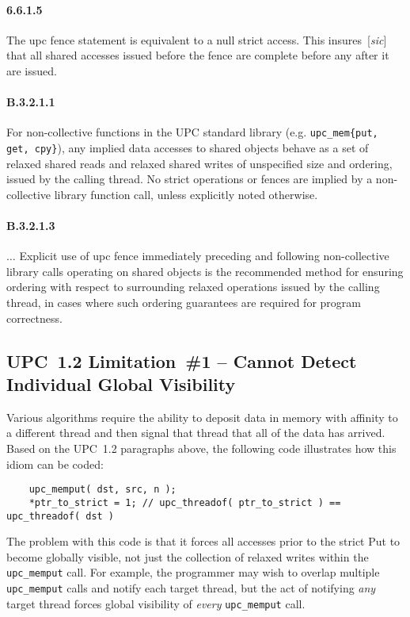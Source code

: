 \documentclass[10pt]{article}
\def \memput  {{\tt upc\_memput}}
\def \memall  {{\tt upc\_mem\{put, get, cpy\}}}
\begin{document}
\paragraph{6.6.1.5} The upc fence statement is equivalent to a null strict
access.  This insures~[{\em sic}] that all shared accesses issued before the
fence are complete before any after it are issued.

\paragraph{B.3.2.1.1} For non-collective functions in the UPC standard library
(e.g. \memall{}), any implied data accesses to shared objects behave as a set of
relaxed shared reads and relaxed shared writes of unspecified size and ordering,
issued by the calling thread. No strict operations or fences are implied by a
non-collective library function call, unless explicitly noted otherwise.

\paragraph{B.3.2.1.3} $\ldots$ Explicit use of upc fence immediately preceding
and following non-collective library calls operating on shared objects is the
recommended method for ensuring ordering with respect to surrounding relaxed
operations issued by the calling thread, in cases where such ordering guarantees
are required for program correctness.

\subsection{UPC~1.2 Limitation~\#1 -- Cannot Detect Individual Global Visibility}

Various algorithms require the ability to deposit data in memory with affinity
to a different thread and then signal that thread that all of the data has
arrived.  Based on the UPC~1.2 paragraphs above, the following code illustrates
how this idiom can be coded:

\begin{verbatim}
    upc_memput( dst, src, n );
    *ptr_to_strict = 1; // upc_threadof( ptr_to_strict ) == upc_threadof( dst )
\end{verbatim}

The problem with this code is that it forces all accesses prior to the strict
Put to become globally visible, not just the collection of relaxed writes within
the \memput{} call.  For example, the programmer may wish to overlap multiple
\memput{} calls and notify each target thread, but the act of notifying {\em
any} target thread forces global visibility of {\em every} \memput{} call.
\end{document}
